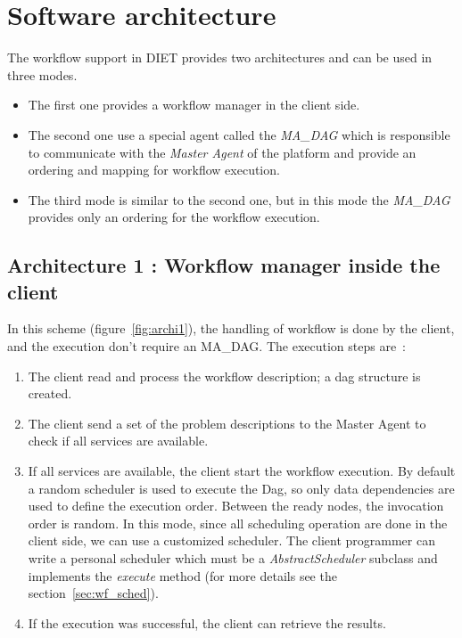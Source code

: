 \section{Software architecture}

The workflow support in \textsc{DIET} provides two architectures and
can be used in three modes.
\begin{itemize}
\item The first one provides a workflow manager in the client side.
\item The second one use a special agent called the \textit{MA\_DAG}
  which is responsible to communicate with the \textit{Master Agent} of
  the platform and provide an ordering and mapping for workflow
  execution.
\item The third mode is similar to the second one, but in this mode
  the \textit{MA\_DAG} provides only an ordering for the workflow
  execution.
\end{itemize}

\subsection{Architecture 1 : Workflow manager inside the client}
\label{sec:archi1}

In this scheme (figure~\ref{fig:archi1}), the handling of workflow is
done by the client, and the execution don't require an MA\_DAG. The
execution steps are~:

\begin{enumerate}
\item The client read and process the workflow description; a dag
  structure is created.
\item The client send a set of the problem descriptions to the
  Master Agent to check if all services are available.
\item If all services are available, the client start the workflow
  execution. By default a random scheduler is used to execute the Dag,
  so only data dependencies are used to define the execution order.
  Between the ready nodes, the invocation order is random. In this
  mode, since all scheduling operation are done in the client side, we
  can use a customized scheduler. The client programmer can write a
  personal scheduler which must be a \textit{AbstractScheduler}
  subclass and implements the \textit{execute} method (for more
  details see the section~\ref{sec:wf_sched}).
\item If the execution was successful, the client can retrieve the
  results.
\end{enumerate}

